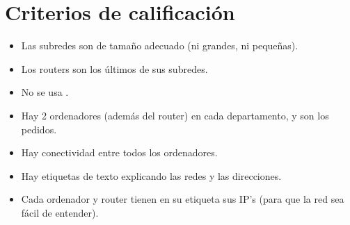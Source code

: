 \section{Criterios de calificación}
\begin{itemize}
\item Las subredes son de tamaño adecuado (ni grandes, ni pequeñas).
\item Los routers son los últimos de sus subredes.
\item No se usa \texttt{}.
\item Hay 2 ordenadores (además del router) en cada departamento, y son los pedidos.
\item Hay conectividad entre todos los ordenadores.
\item Hay etiquetas de texto explicando las redes y las direcciones.
\item Cada ordenador y router tienen en su etiqueta sus IP’s (para que la red sea fácil de entender).
\end{itemize}


